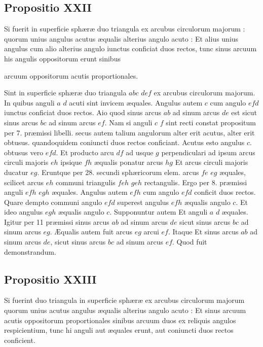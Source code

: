 \documentclass[11pt,a4paper]{article}
\begin{document}
\subsection*{Propositio XXII}

Si fuerit in superficie sphæræ duo triangula ex arcubus circulorum majorum : quorum unius angulus acutus æqualis alterius angulo acuto : Et alius unius angulus cum alio alterius angulo iunctus conficiat duos rectos, tunc sinus arcuum his angulis oppositorum erunt sinibus

arcuum oppositorum acutis proportionales.

Sint in superficie sphæræ duo triangula $abc$ $def$ ex arcubus circulorum majorum. In quibus anguli $a$ $d$ acuti sint invicem æquales. Angulus autem $c$ cum angulo $efd$ iunctus conficiat duos rectos. Aio quod sinus arcus $ab$ ad sinum arcus $de$ est sicut sinus arcus $bc$ ad sinum arcus $ef$. Nam si anguli $c$ $f$ sint recti constat propositum per 7. præmissi libelli. secus autem talium angulorum alter erit acutus, alter erit obtusus. quandoquidem coniuncti duos rectos conficiant. Acutus esto angulus $c$. obtusus vero $efd$. Et producto arcu $df$ ad usque $g$ perpendiculari ad ipsum arcus circuli majoris $eh$ ipsique $fh$ æqualis ponatur arcus $hg$ Et arcus circuli majoris ducatur $eg$. Eruntque per 28. secundi sphæricorum elem. arcus $fe$ $eg$ æquales, scilicet arcus $eh$ communi triangulis $feh$ $geh$ rectangulis. Ergo per 8. præmissi anguli $efh$ $egh$ æquales. Angulus autem $efh$ cum angulo $efd$ conficit duos rectos. Quare dempto communi angulo $efd$ superest angulus $efh$ æqualis angulo $c$. Et ideo angulus $egh$ æqualis angulo $c$. Supponuntur autem Et anguli $a$ $d$ æquales. Igitur per 11 præmissi sinus arcus $ab$ ad sinum arcus $de$ sicut sinus arcus $bc$ ad sinum arcus $eg$. Æqualis autem fuit arcus $eg$ arcui $ef$. Itaque Et sinus arcus $ab$ ad sinum arcus $de$, sicut sinus arcus $bc$ ad sinum arcus $ef$. Quod fuit demonstrandum.

\subsection*{Propositio XXIII}

Si fuerint duo triangula in superficie sphæræ ex arcubus circulorum majorum quorum unius acutus angulus æqualis alterius angulo acuto : Et sinus arcuum acutis oppositorum proportionales sinibus arcuum duos ex reliquis angulos respicientium, tunc hi anguli aut æquales erunt, aut coniuncti duos rectos conficient.
\end{document}
